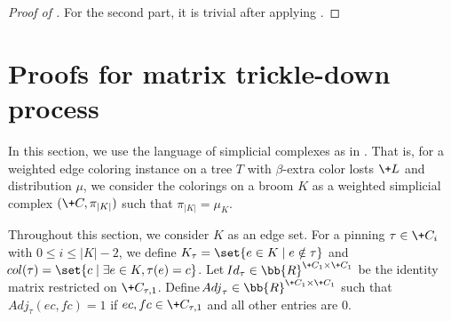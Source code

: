\documentclass[a4paper,11pt]{article}
\begin{document}
\begin{proof}[Proof of ]
    For the second part, it is trivial after applying .
\end{proof}

 



\appendix

\section{Proofs for matrix trickle-down process}
\label{appendix-mtd}
In this section, we use the language of simplicial complexes as in .
That is, for a weighted edge coloring instance on a tree $T$ with $\beta$-extra
color losts $\+L$ and distribution $\mu$, we consider the colorings on a broom $K$ 
as a weighted simplicial complex $(\+C, \pi_{|K|})$ such that $\pi_{|K|} = \mu_K$.

Throughout this section, we consider $K$ as an edge set.
For a pinning $\tau\in \+C_{i}$ with $0\le i\le|K|-2$, we define
$K_\tau = \set{e\in K\mid e\notin \tau}$ and $\!{col}(\tau)=\set{c \mid \exists e\in K, \tau(e)=c}$. Let $\!{Id}_\tau \in \bb{R}^{\+C_1\times \+C_1}$ be the identity matrix restricted on $\+C_{\tau,1}$. Define 
$\!{Adj}_\tau \in \bb{R}^{\+C_1\times \+C_1}$ such that $\!{Adj}_\tau(ec,fc)=1$ if $ec,fc\in \+C_{\tau,1}$ and all other entries are $0$.
\end{document}
